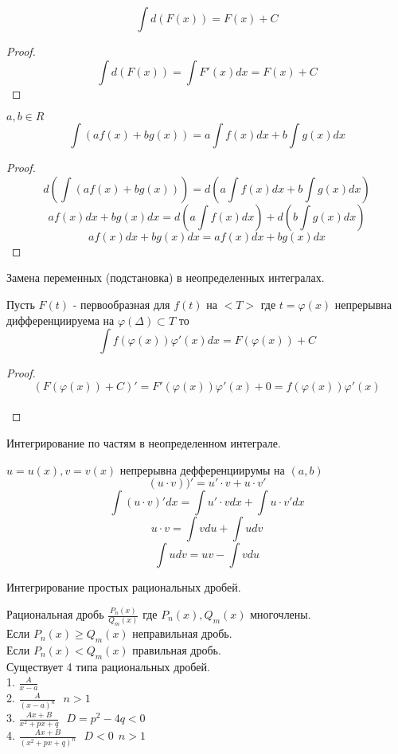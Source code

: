  \[\int d(F(x)) = F(x) + C\]
\begin{proof}
  \[\int d(F(x)) = \int F'(x)dx = F(x) + C\]
\end{proof}

 $a, b \in R$\\
\[\int (af(x) + bg(x)) = a \int f(x)dx + b \int g(x)dx\]
\begin{proof}
  $$
  d \left( \int (af(x) + bg(x)) \right) =
  d \left( a \int f(x)dx + b \int g(x)dx \right)
  $$
  $$
  a f(x)dx + b g(x)dx =
  d \left( a \int f(x)dx \right) +
  d \left( b \int g(x)dx \right)
  $$
  $$
  a f(x)dx + b g(x)dx =  a f(x)dx + b g(x)dx
  $$
\end{proof}

\begin{title}[\Large]
  Замена переменных (подстановка) в неопределенных интегралах.
\end{title}

\begin{theorem}
  Пусть $F(t)$ - первообразная для $f(t)$ на $<T>$ где $t = \varphi (x)$
  непрерывна дифференциируема на $\varphi(\Delta) \subset T$ то
  \[\int f(\varphi (x)) \varphi'(x)dx = F(\varphi (x)) + C\]
\end{theorem}

\begin{proof}
  \[(F(\varphi(x)) + C)' = F'(\varphi (x)) \varphi'(x) + 0 = f(\varphi(x))
    \varphi'(x)\]\\
\end{proof}

\begin{title}[\Large]
  Интегрирование по частям в неопределенном интеграле.
\end{title}
$u = u(x), v = v(x)$ непрерывна дефференциирумы на $(a,b)$
$$(u\cdot v))' = u'\cdot v + u\cdot v'$$
$$\int(u \cdot v)'dx = \int u'\cdot vdx + \int u\cdot v'dx$$
$$u\cdot v = \int vdu + \int udv$$
\[\int udv = uv - \int vdu\]

\begin{title}[\Large]
  Интегрирование простых рациональных дробей.
\end{title}
Рациональная дробь $\frac{P_n(x)}{Q_m(x)}$ где $P_n(x), Q_m(x)$ многочлены.\\
Если $P_n(x) \ge Q_m(x)$ неправильная дробь.\\
Если $P_n(x) < Q_m(x)$ правильная дробь.\\

Существует 4 типа рациональных дробей.\\
1. $\frac{A}{x-a}$\\
2. $\frac{A}{(x-a)^n} ~~~ n > 1$\\
3. $\frac{Ax + B}{x^2 + px +q} ~~~ D = p^2 - 4q < 0$\\
4. $\frac{Ax + B}{(x^2 + px +q)^n} ~~~ D < 0 ~~ n > 1$\\

